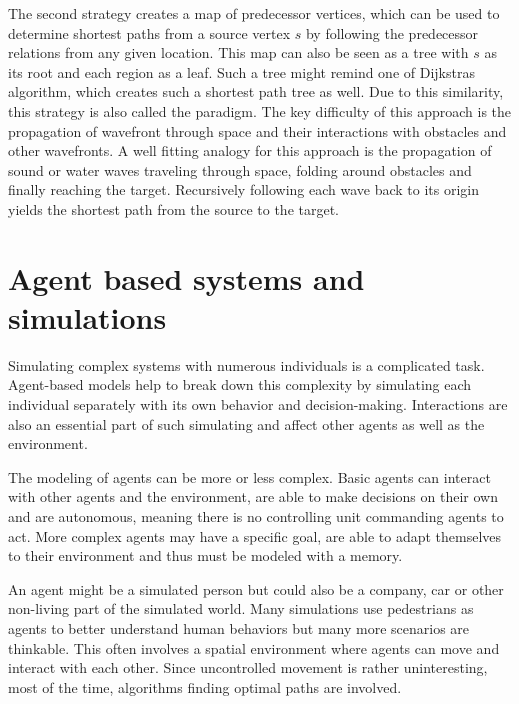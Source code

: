 		The second strategy creates a map of predecessor vertices, which can be used to determine shortest paths from a source vertex $s$ by following the predecessor relations from any given location.
		This map can also be seen as a tree with $s$ as its root and each region as a leaf.
		Such a tree might remind one of Dijkstras algorithm, which creates such a shortest path tree as well.
		Due to this similarity, this strategy is also called the  paradigm\cite[648]{mitchell-discrete-geodesic}.
		The key difficulty of this approach is the propagation of wavefront through space and their interactions with obstacles and other wavefronts\cite[3]{hershberger-suri}.
		A well fitting analogy for this approach is the propagation of sound or water waves traveling through space, folding around obstacles and finally reaching the target.
		Recursively following each wave back to its origin yields the shortest path from the source to the target.

\section{Agent based systems and simulations}

	Simulating complex systems with numerous individuals is a complicated task.
	Agent-based models help to break down this complexity by simulating each individual separately with its own behavior and decision-making. \cite{macal2014introductory}
	Interactions are also an essential part of such simulating and affect other agents as well as the environment.
	
	The modeling of agents can be more or less complex.
	Basic agents can interact with other agents and the environment, are able to make decisions on their own and are autonomous, meaning there is no controlling unit commanding agents to act.
	More complex agents may have a specific goal, are able to adapt themselves to their environment and thus must be modeled with a memory.
	
	An agent might be a simulated person but could also be a company, car or other non-living part of the simulated world.
	Many simulations use pedestrians as agents to better understand human behaviors but many more scenarios are thinkable\cite[8]{macal2014introductory}.
	This often involves a spatial environment where agents can move and interact with each other.
	Since uncontrolled movement is rather uninteresting, most of the time, algorithms finding optimal paths are involved\cite{kneidl-borrmann-hartmann-navigation,gloor-hybrid-pedestrian-routing,teknomo-millonig-routing}.
	
